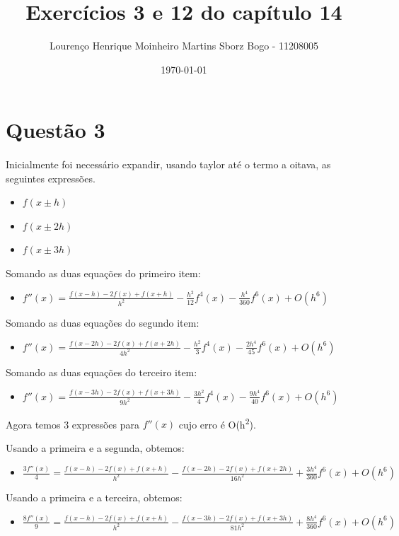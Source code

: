 \documentclass[11pt]{article}
\author{Lourenço Henrique Moinheiro Martins Sborz Bogo - 11208005}
\date{\today}
\title{Exercícios 3 e 12 do capítulo 14}
\begin{document}
\maketitle
\tableofcontents

\newpage
\section{Questão 3}
\label{sec:org7146402}
\paragraph{} Inicialmente foi necessário expandir, usando taylor até o termo a oitava, as seguintes expressões.
\begin{itemize}
\item \(f(x\pm h)\)
\item \(f(x\pm 2h)\)
\item \(f(x\pm 3h)\)
\end{itemize}
Somando as duas equações do primeiro item:
\begin{itemize}
\item \(f''(x) = \frac{f(x-h)-2f(x)+f(x+h)}{h^2} - \frac{h^2}{12}f^4(x) - \frac{h^4}{360}f^6(x) + O(h^6)\)
\end{itemize}
Somando as duas equações do segundo item:
\begin{itemize}
\item \(f''(x) = \frac{f(x-2h)-2f(x)+f(x+2h)}{4h^2} - \frac{h^2}{3}f^4(x) - \frac{2h^4}{45}f^6(x) + O(h^6)\)
\end{itemize}
Somando as duas equações do terceiro item:
\begin{itemize}
\item \(f''(x) = \frac{f(x-3h)-2f(x)+f(x+3h)}{9h^2} - \frac{3h^2}{4}f^4(x) - \frac{9h^4}{40}f^6(x) + O(h^6)\)
\end{itemize}

Agora temos 3 expressões para \(f''(x)\) cujo erro é O(h\textsuperscript{2}).

Usando a primeira e a segunda, obtemos:
\begin{itemize}
\item \(\frac{3f''(x)}{4} = \frac{f(x-h)-2f(x)+f(x+h)}{h^2} - \frac{f(x-2h)-2f(x)+f(x+2h)}{16h^2} + \frac{3h^4}{360}f^6(x) + O(h^6)\)
\end{itemize}
Usando a primeira e a terceira, obtemos:
\begin{itemize}
\item \(\frac{8f''(x)}{9} = \frac{f(x-h)-2f(x)+f(x+h)}{h^2} - \frac{f(x-3h)-2f(x)+f(x+3h)}{81h^2} + \frac{8h^4}{360}f^6(x) + O(h^6)\)
\end{itemize}
\end{document}
